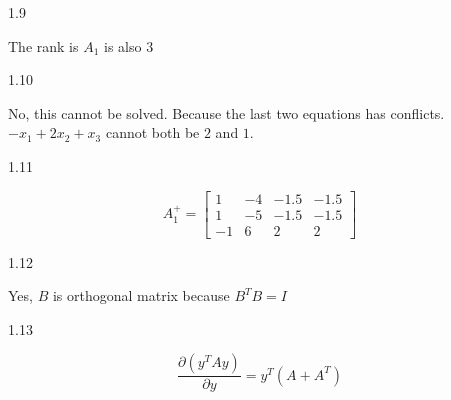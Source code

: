 \documentclass[11pt]{article}
\begin{document}
\begin{enumerate}
1.9

The rank is $A_1$ is also $3$

1.10

No, this cannot be solved. Because the last two equations has conflicts. $-x_1+2x_2+x_3$ cannot both be $2$ and $1$.

1.11

$$
A_1^+ = \begin{bmatrix}
    1 & -4 & -1.5 & -1.5 \\
    1 & -5 & -1.5 & -1.5 \\
    -1 & 6 & 2 & 2
\end{bmatrix}
$$

1.12

Yes, $B$ is orthogonal matrix because $B^TB=I$

1.13

$$ \frac{\partial (y^TAy)}{\partial y} = y^T(A + A^T)$$


\end{enumerate}
\end{document}
